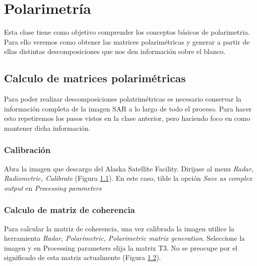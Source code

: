 \chapter{Polarimetría}

Esta clase tiene como objetivo comprender los conceptos básicos de polarimetria. Para ello veremos como obtener las matrices polarimétricas y generar a partir de ellas distintas descomposiciones que nos den información sobre el blanco.

\section{Calculo de matrices polarimétricas}

Para poder realizar descomposiciones polatrimétricas es necesario conservar la información completa de la imagen SAR a lo largo de todo el proceso. Para hacer esto repetiremos los pasos vistos en la clase anterior, pero haciendo foco en como mantener dicha información.

\subsection{Calibración}
Abra la imagen  que descargo del Alaska Satellite Facility.  Dirijase al menu \emph{Radar, Radiometric, Calibrate} (Figura \ref{fig:calibrar}). En este caso, tilde la opción \emph{Save as complex output} en \emph{Processing parameters}

\begin{figure}[h!]
    \centering
    \hfill
    \caption{}
    \label{fig:calibrar}
\end{figure}

\subsection{Calculo de matriz de coherencia}

Para calcular la matriz de coherencia, una vez calibrada la imagen utilice la herramienta \emph{Radar, Polarimetric, Polarimetric matrix generation}. Seleccione la imagen  y en Processing parameters elija la matrix T3. No se preocupe por el significado de esta matriz actualmente (Figura \ref{fig:t3}).

\begin{figure}[h!]
    \centering
    \hfill
    \caption{}
    \label{fig:t3}
\end{figure}

